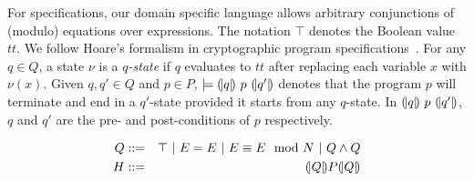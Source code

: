 For specifications, our domain specific language allows arbitrary
conjunctions of (modulo) equations over expressions. The notation
$\top$ denotes the Boolean value $\mathit{tt}$. We follow Hoare's
formalism in cryptographic program specifications~\cite{H:69:ABCP}. 
For any $q \in Q$, a state $\nu$ is a \emph{$q$-state} if 
$q$ evaluates to $\mathit{tt}$ after replacing each variable $x$ with
$\nu (x)$. Given $q, q' \in Q$ and $p \in P$, $\models
{(\!|}{q}{|\!)}~{p}~{(\!|}{q'}{|\!)}$ 
denotes that the program $p$ will terminate and end in a $q'$-state
provided it starts from any $q$-state. In ${(\!|}{q}{|\!)}~{p}~{(\!|}{q'}{|\!)}$,
$q$ and $q'$ are the pre- and post-conditions of $p$ respectively.

\begin{eqnarray*}
  Q & ::= & \top
     \ |\   E = E
     \ |\   E \equiv E \mod N
     \ |\   Q \wedge Q\\
  H & ::= & {(\!|}{Q}{|\!)} P {(\!|}{Q}{|\!)}
\end{eqnarray*}


